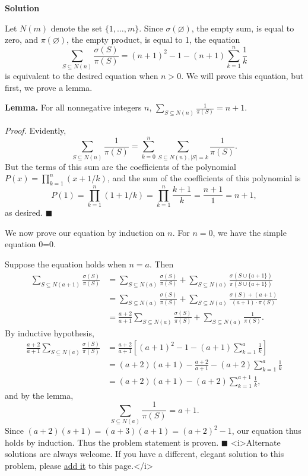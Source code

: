 \begin{enumerate}
 



\textbf{Solution}

Let $N(m)$ denote the set $\{1, \dotsc, m\}$.  Since $\sigma(\varnothing)$, the empty sum, is equal to zero, and $\pi(\varnothing)$, the empty product, is equal to 1, the equation
 \[\sum_{S \subseteq N(n)} \frac{\sigma(S)}{\pi(S)} = (n+1)^2 -1 - (n+1)\sum_{k=1}^n \frac{1}{k}\]is equivalent to the desired equation when $n >0$.  We will prove this equation, but first, we prove a lemma.

 \textbf{Lemma.}  For all nonnegative integers $n$, $\sum_{S \subseteq N(n)} \frac{1}{\pi(S)} = n+1$.

 \textit{Proof.} Evidently,
 \[\sum_{S \subseteq N(n)} \frac{1}{\pi(S)} = \sum_{k=0}^n \sum_{S \subseteq N(n), |S| =k} \frac{1}{\pi(S)} .\]But the terms of this sum are the coefficients of the polynomial $P(x) = \prod_{k=1}^n (x + 1/k)$, and the sum of the coefficients of this polynomial is
 \[P(1) = \prod_{k=1}^n(1 + 1/k) = \prod_{k=1}^n \frac{k+1}{k} = \frac{n+1}{1} = n+1,\]as desired.  $\blacksquare$

 We now prove our equation by induction on $n$.  For $n=0$, we have the simple equation 0=0.

 Suppose the equation holds when $n=a$.  Then
 \begin{align*} \sum_{S \subseteq N(a+1)} \frac{\sigma(S)}{\pi(S)} &= \sum_{S \subseteq N(a)} \frac{\sigma(S)}{\pi(S)} + \sum_{S \subseteq N(a)} \frac{\sigma(S \cup \{a+1\})}{\pi(S \cup \{a+1\})} \\ &= \sum_{S \subseteq N(a)} \frac{\sigma(S)}{\pi(S)} + \sum_{S \subseteq N(a)} \frac{\sigma(S) + (a+1)}{(a+1) \cdot \pi(S)}  \\ &= \frac{a+2}{a+1} \sum_{S\subseteq N(a)} \frac{\sigma(S)}{\pi(S)} + \sum_{S \subseteq N(a)} \frac{1}{\pi(S)} . \end{align*}
By inductive hypothesis,
 \begin{align*} \frac{a+2}{a+1} \sum_{S \subseteq N(a)} \frac{\sigma(S)}{\pi(S)} &= \frac{a+2}{a+1} \left[ (a+1)^2 -1 - (a+1) \sum_{k=1}^a \frac{1}{k} \right] \\ &= (a+2)(a+1)  - \frac{a+2}{a+1} - (a+2) \sum_{k=1}^a \frac{1}{k} \\ &= (a+2)(a+1) - (a+2) \sum_{k=1}^{a+1} \frac{1}{k}, \end{align*}
and by the lemma,
 \[\sum_{S \subseteq N(a)} \frac{1}{\pi(S)} = a+1 .\]Since $(a+2)(s+1) = (a+3)(a+1) = (a+2)^2 -1$, our equation thus holds by induction.  Thus the problem statement is proven.  $\blacksquare$
<i>Alternate solutions are always welcome. If you have a different, elegant solution to this problem, please \href{https://artofproblemsolving.com/wiki/index.php?title=1991\_USAMO\_Problems/Problem\_2&action=edit}{add it} to this page.</i>




\end{enumerate}
